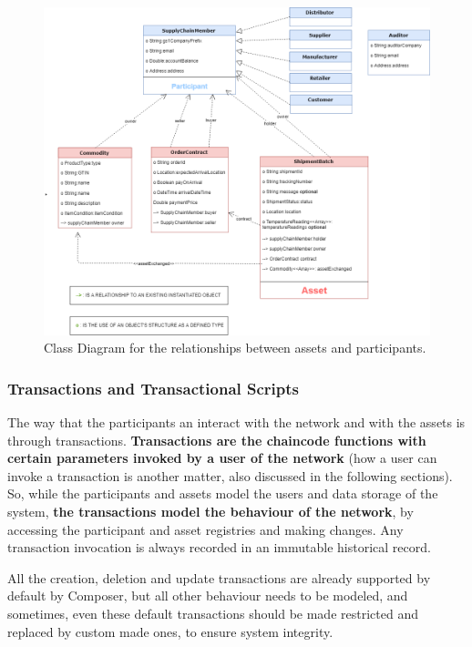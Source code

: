 \begin{figure}[h]
    \centering
    \includegraphics[scale=0.40]{media/participant_asset_relationship.png}
    \caption[Class Diagram for the relationships between assets and participants.]{Class Diagram for the relationships between assets and participants.}
    \label{fig:participant_asset}
\end{figure}


\subsubsection*{Transactions and Transactional Scripts}
The way that the participants an interact with the network and with the assets is through transactions. \textbf{Transactions are the chaincode functions with certain parameters invoked by a user of the network} (how a user can invoke a transaction is another matter, also discussed in the following sections). So, while the participants and assets model the users and data storage of the system, \textbf{the transactions model the behaviour of the network}, by accessing the participant and asset registries and making changes. Any transaction invocation is always recorded in an immutable historical record.

All the creation, deletion and update transactions are already supported by default by Composer, but all other behaviour needs to be modeled, and sometimes, even these default transactions should be made restricted and replaced by custom made ones, to ensure system integrity.


